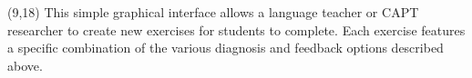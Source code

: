 \documentclass[a0,portrait]{a0poster}
\def\bannercolor{BannerSixColor}
\newcommand{\headingcolor}{\color{BannerSixColor}}
\newcommand{\titlecolor}{\color{TitleColor}}
\newcommand{\banner}{\LARGE \tikz{\path[draw=\bannercolor,fill=\bannercolor] (0,0) rectangle (\linewidth,2.25em);}}
\def\Highlight#1{{\sffamily \headingcolor #1}}
\let\Textsize\Large
\def\LHead#1{\noindent{\sffamily \LARGE \headingcolor #1}\smallskip}
\begin{document}
 \begin{textblock}{2.35}(9,18)
   \Textsize
  This simple graphical interface allows a language teacher or CAPT researcher to create new exercises for students to complete. Each exercise features a specific combination of the various diagnosis and feedback options described above. %
  
  
 
 
% 

%  
  
\end{textblock}


% 
\end{document}
